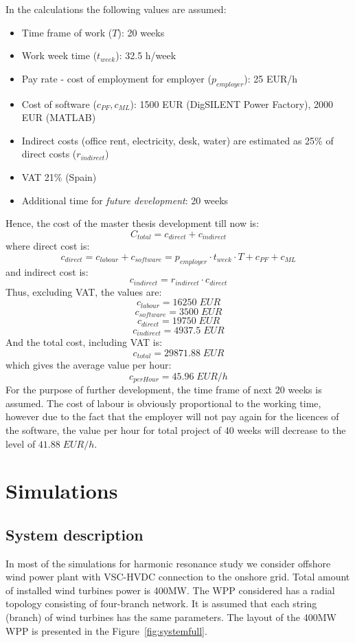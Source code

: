 \documentclass[12pt]{report} %
\begin{document}
In the calculations the following values are assumed:
\begin{itemize}
	\item Time frame of work ($T$): 20 weeks
	\item Work week time ($t_{week}$): 32.5 h/week
	\item Pay rate - cost of employment for employer ($p_{employer}$): 25 EUR/h
	\item Cost of software ($c_{PF}, c_{ML}$): 1500 EUR (DigSILENT Power Factory), 2000 EUR (MATLAB)
	\item Indirect costs (office rent, electricity, desk, water) are estimated as 25\% of direct costs ($r_{indirect}$)
	\item VAT 21\% (Spain)
	\item Additional time for \textit{future development}: 20 weeks
\end{itemize}

Hence, the cost of the master thesis development till now is:
$$C_{total} = c_{direct}+c_{indirect}$$
where direct cost is:
$$c_{direct} = c_{labour} + c_{software} = p_{employer} \cdot t_{week} \cdot T + c_{PF} + c_{ML}$$
and indirect cost is:
$$c_{indirect} = r_{indirect} \cdot c_{direct}$$
Thus, excluding VAT, the values are:
$$c_{labour} = 16250\; EUR$$
$$c_{software} = 3500\; EUR $$
$$c_{direct} = 19750\; EUR $$
$$c_{indirect} = 4937.5\; EUR $$
And the total cost, including VAT is:
$$c_{total}=29871.88\; EUR$$
which gives the average value per hour:
$$c_{perHour}=45.96\; EUR/h$$
For the purpose of further development, the time frame of next 20 weeks is assumed. The cost of labour is obviously proportional to the working time, however due to the fact that the employer will not pay again for the licences of the software, the value per hour for total project of 40 weeks will decrease to the level of $41.88\; EUR/h$.

\chapter{Simulations} \label{ch2}

\section{System description}
In most of the simulations for harmonic resonance study we consider offshore wind power plant with VSC-HVDC connection to the onshore grid. Total amount of installed wind turbines power is 400MW. The WPP considered has a radial topology consisting of four-branch network. It is assumed that each string (branch) of wind turbines has the same parameters. The layout of the 400MW WPP is presented in the Figure~\ref{fig:systemfull}.
\end{document}
